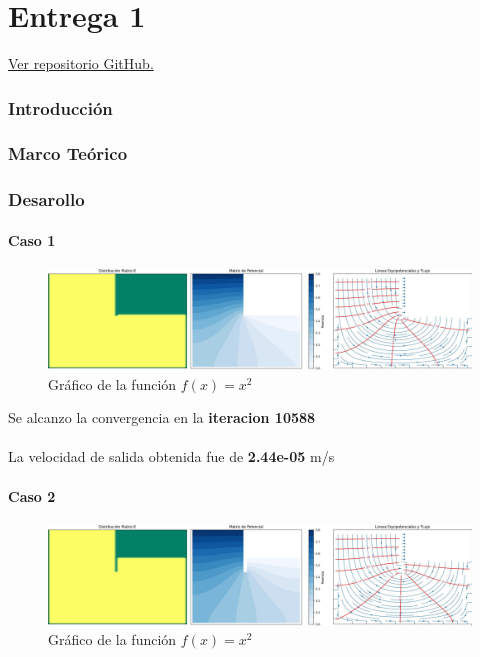 \part{Entrega 1}

\begin{center}
    \href{https://github.com/LukasWolff2002/PROYECTO_1_MCOC_ENTREGA_1}{Ver repositorio GitHub.}
\end{center}

\setcounter{section}{0}

\section{Introducción}

\section{Marco Teórico}



\section{Desarollo}

\subsection{Caso 1}

\begin{figure}[H]
    \centering
    \includegraphics[width=1\textwidth]{GRAFICOS/laplace_caso_1.jpg}
    \caption{Gráfico de la función $f(x) = x^2$}
    \label{fig:caso_1}
\end{figure}

Se alcanzo la convergencia en la \textbf{iteracion 10588}
\\ \\
La velocidad de salida obtenida fue de \textbf{2.44e-05} m/s

\subsection{Caso 2}

\begin{figure}[H]
    \centering
    \includegraphics[width=1\textwidth]{GRAFICOS/laplace_caso_2.jpg}
    \caption{Gráfico de la función $f(x) = x^2$}
    \label{fig:caso_2}
\end{figure}

